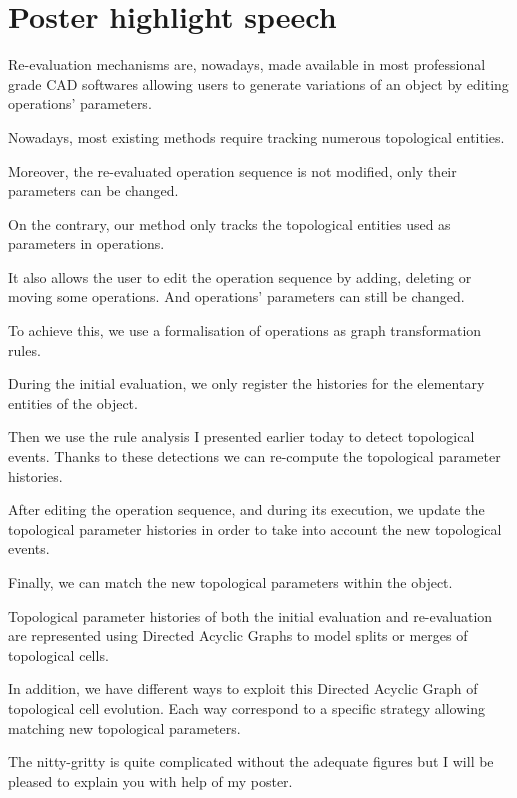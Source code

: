 \documentclass[11pt]{article}
\date{}
\title{}
\begin{document}
\section{Poster highlight speech}
\label{sec:org1168440}

Re-evaluation mechanisms are, nowadays, made available in most professional grade
CAD softwares allowing users to generate variations of an object by editing 
operations' parameters. 

Nowadays, most existing methods require tracking numerous topological entities.

Moreover, the re-evaluated operation sequence is not modified, only their
parameters can be changed.

On the contrary, our method only tracks the topological entities used as
parameters in operations.

It also allows the user to edit the operation sequence by adding, deleting or
moving some operations. And operations' parameters can still be changed.

To achieve this, we use a formalisation of operations as graph transformation
rules.

During the initial evaluation, we only register the histories for the elementary
entities of the object.

Then we use the rule analysis I presented earlier today to detect topological events.
Thanks to these detections we can re-compute the topological parameter histories.

After editing the operation sequence, and during its execution, we update the
topological parameter histories in order to take into account the new
topological events.

Finally, we can match the new topological parameters within the object.

Topological parameter histories of both the initial evaluation and re-evaluation
are represented using Directed Acyclic Graphs to model splits or merges of
topological cells.

In addition, we have different ways to exploit this Directed Acyclic Graph of
topological cell evolution. Each way correspond to a specific strategy allowing
matching new topological parameters.

The nitty-gritty is quite complicated without the adequate figures but I will be
pleased to explain you with help of my poster.
\end{document}
